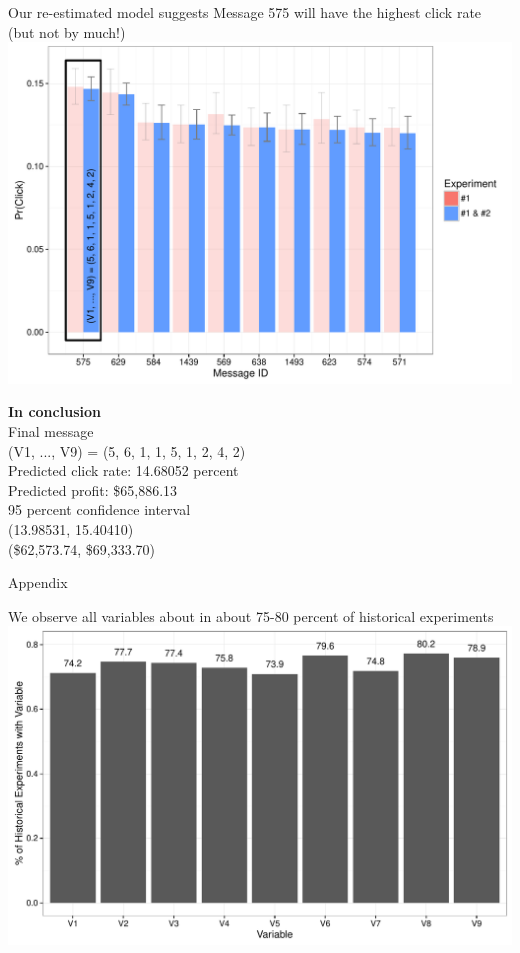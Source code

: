 \documentclass[11pt,xcolor=svgnames]{beamer}
\newcommand{\fg}{\color{ForestGreen}}
\newcommand{\nv}{\color{Navy}}
\begin{document}
\begin{frame}
Our re-estimated model suggests Message 575 will have the highest click rate (but not by much!)
\includegraphics[width=\textwidth]{barplot4.pdf}
\end{frame}


\begin{frame}
\textbf{\Large \nv In conclusion}\\
\vspace{0.2in}
Final message\\
(V1, ..., V9) = (5, 6, 1, 1, 5, 1, 2, 4, 2)\\
\vspace{0.15in}
Predicted click rate: 14.68052 percent\\
{\fg Predicted profit: \$65,886.13}\\
\vspace{0.15in}
95 percent confidence interval\\
(13.98531, 15.40410)\\
{\fg (\$62,573.74, \$69,333.70)}
\end{frame}

\begin{frame}[c]{ }
\centering
Appendix
\end{frame}

\begin{frame}
We observe all variables about in about 75-80 percent of historical experiments
\includegraphics[width=\textwidth]{hist_freq.pdf}
\end{frame}
\end{document}
